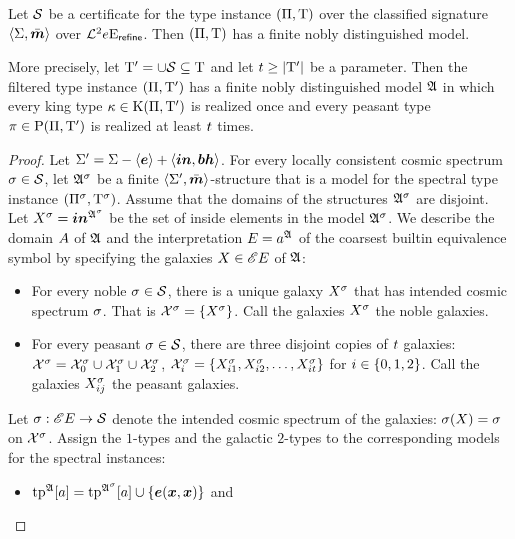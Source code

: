 \begin{lemma}\label{lem:cert-exp-many}
Let $\mathcal{S}$ be a certificate for the type instance $(\Pi,\mathrm{T})$ over the
classified signature $\left\langle \mathrm{\Sigma},\bar{\bm{m}} \right\rangle$ over $\mathcal{L}^{2}{e}\mathrm{E}_{\mathsf{refine}}$. Then
$(\Pi,\mathrm{T})$ has a finite nobly distinguished model.

More precisely, let ${\mathrm{T}'} = \cup\mathcal{S} \subseteq \mathrm{T}$ and let $t \geq
\left|{\mathrm{T}'}\right|$ be a parameter. Then the filtered type instance $(\Pi,{\mathrm{T}'})$
has a finite nobly distinguished model $\mathfrak{A}$ in which every king type $\kappa
\in \mathrm{K}(\Pi,{\mathrm{T}'})$ is realized once and every peasant type $\pi \in
\mathrm{P}(\Pi,{\mathrm{T}'})$ is realized at least $t$ times.
\end{lemma}
\begin{proof}
Let $\mathrm{\Sigma'} = \mathrm{\Sigma} - \left\langle \bm{e} \right\rangle + \left\langle \bm{in},\bm{bh} \right\rangle$.
For every locally consistent cosmic spectrum $\sigma \in \mathcal{S}$, let
$\mathfrak{A}^{\sigma}$ be a finite $\left\langle \mathrm{\Sigma'},\bar{\bm{m}} \right\rangle$-structure that is a model for the
spectral type instance $(\Pi^{\sigma},\mathrm{T}^{\sigma})$. Assume that the domains
of the structures $\mathfrak{A}^{\sigma}$ are disjoint.
Let $X^\sigma = \bm{in}^{\mathfrak{A}^{\sigma}}$ be the set of inside elements in the
model $\mathfrak{A}^{\sigma}$. We describe the domain $A$ of $\mathfrak{A}$ and the
interpretation $E = a^{\mathfrak{A}}$ of the coarsest builtin equivalence symbol
by specifying the galaxies $X \in {\mathscr{E}E}$ of $\mathfrak{A}$:
\begin{itemize}
  \item For every noble $\sigma \in \mathcal{S}$, there is a unique galaxy
  $X^\sigma$ that has intended cosmic spectrum $\sigma$.
  That is $\mathcal{X}^\sigma = \left\{X^\sigma\right\}$.
  Call the galaxies $X^\sigma$ the noble galaxies.
  \item For every peasant $\sigma \in \mathcal{S}$, there are three disjoint copies of
  $t$ galaxies: $\mathcal{X}^\sigma = \mathcal{X}^\sigma_0 \cup
  \mathcal{X}^\sigma_1 \cup \mathcal{X}^\sigma_2$,
  $\mathcal{X}^\sigma_i =
  \left\{X^\sigma_{i1},X^\sigma_{i2},\dots,X^\sigma_{it}\right\}$ for $i \in
  \left\{0,1,2\right\}$.
  Call the galaxies $X^\sigma_{ij}$ the peasant galaxies.
\end{itemize}
Let $\sigma : {\mathscr{E}E} \to \mathcal{S}$ denote the intended cosmic spectrum of the
galaxies: $\sigma(X) = \sigma$ on $\mathcal{X}^\sigma$.
Assign the $1$-types and the galactic $2$-types to the corresponding models for
the spectral instances:
\begin{itemize}
  \item $\operatorname{tp}^{\mathfrak{A}}[a] = \operatorname{tp}^{\mathfrak{A}^{\sigma}}[a] \cup \left\{\bm{e}(\bm{x},\bm{x})\right\}$ and 

\end{itemize}
\end{proof}
